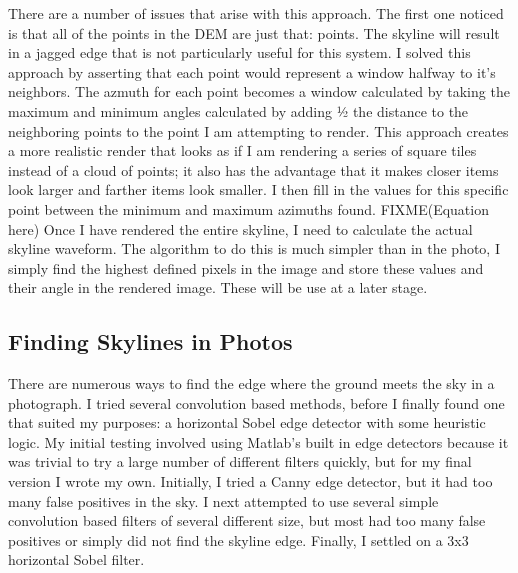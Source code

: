 \documentclass{acm_proc_article-sp}
\begin{document}
There are a number of issues that arise with this approach.  The first one noticed is that all of the points in the DEM are just that: points.  The skyline will result in a jagged edge that is not particularly useful for this system.  I solved this approach by asserting that each point would represent a window halfway to it’s neighbors.  The azmuth for each point becomes a window calculated by taking the maximum and minimum angles calculated by adding ½ the distance to the neighboring points to the point I am attempting to render.  This approach creates a more realistic render that looks as if I am rendering a series of square tiles instead of a cloud of points; it also has the advantage that it makes closer items look larger and farther items look smaller.  I then fill in the values for this specific point between the minimum and maximum azimuths found. FIXME(Equation here)
    Once I have rendered the entire skyline, I need to calculate the actual skyline waveform.  The algorithm to do this is much simpler than in the photo, I simply find the highest defined pixels in the image and store these values and their angle in the rendered image. These will be use at a later stage.

\subsection{Finding Skylines in Photos}
    There are numerous ways to find the edge where the ground meets the sky in a photograph.  I tried several convolution based methods, before I finally found one that suited my purposes:  a horizontal Sobel edge detector with some heuristic logic.  My initial testing involved using Matlab’s built in edge detectors \cite{mcandrew2004introduction} because it was trivial to try a large number of different filters quickly, but for my final version I wrote my own.  Initially, I tried a Canny edge detector, but it had too many false positives in the sky.  I next attempted to use several simple convolution \cite{Schafer:DSP} based filters of several different size, but most had too many false positives or simply did not find the skyline edge.  Finally, I settled on a 3x3 horizontal Sobel filter. \cite{behringer2002registration}  
\end{document}
